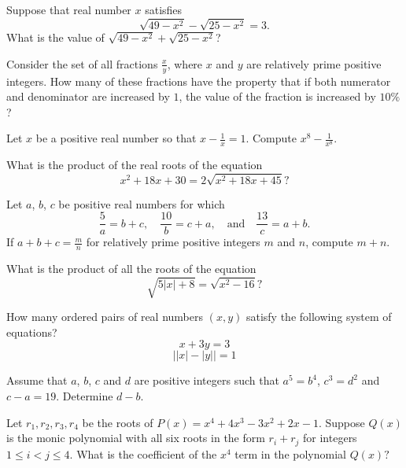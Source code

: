 \documentclass[mast]{lucky}
\begin{document}
\begin{prob}[2018 AMC 10A/10]{3}
Suppose that real number $x$ satisfies \[\sqrt{49-x^2}-\sqrt{25-x^2}=3.\] What is the value of $\sqrt{49-x^2}+\sqrt{25-x^2}$?
\end{prob}

\begin{prob}[AMC 10A 2015/15]{3}
Consider the set of all fractions $\frac{x}{y}$, where $x$ and $y$ are relatively prime positive integers. How many of these fractions have the property that if both numerator and denominator are increased by $1$, the value of the fraction is increased by $10\%$?
\end{prob}

\begin{prob}[2018 BmMT]{4}
Let $x$ be a positive real number so that $x - \frac{1}{x} = 1$.  Compute  $x^8 - \frac{1}{x^8}$.
\end{prob}

\begin{prob}[1983 AIME/3]{4}
What is the product of the real roots of the equation \[x^2 + 18x + 30 = 2 \sqrt{x^2 + 18x + 45}?\]
\end{prob}

\begin{prob}{4}
Let $a$, $b$, $c$ be positive real numbers for which
\[
  \frac{5}{a} = b+c, \quad
  \frac{10}{b} = c+a, \quad \text{and} \quad
  \frac{13}{c} = a+b.
\]
If $a+b+c = \frac mn$ for relatively prime positive integers $m$ and $n$, compute $m+n$.
\end{prob}
  
\begin{prob}[AMC 10B 2011/19]{4}
What is the product of all the roots of the equation\[\sqrt{5 | x | + 8} = \sqrt{x^2 - 16}?\]
\end{prob}

\begin{prob}[AMC 10A 2018/12]{5}
How many ordered pairs of real numbers $(x,y)$ satisfy the following system of equations?\[x+3y=3\]\[\big||x|-|y|\big|=1\]
\end{prob}

\begin{prob}[1985 AIME/7]{5}
Assume that $a$, $b$, $c$ and $d$ are positive integers such that $a^5 = b^4$, $c^3 = d^2$ and $c - a = 19$. Determine $d - b$.
\end{prob}  

\begin{prob}[JMC 10 2021/22]{5}
Let $r_1,r_2,r_3,r_4$ be the roots of $P(x)= x^4+4x^3-3x^2+2x-1.$ Suppose $Q(x)$ is the monic polynomial with all six roots in the form $r_{i}+r_{j}$ for integers $1\le i < j \le 4.$ What is the coefficient of the $x^4$ term in the polynomial $Q(x)?$
\end{prob}
\end{document}
